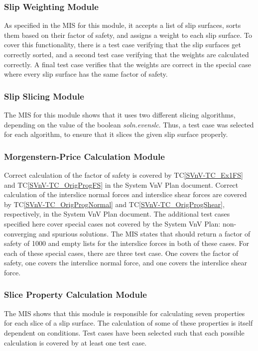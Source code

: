 \documentclass[12pt, titlepage]{article}
\newcommand{\tcref}[1]{TC\ref{#1}}
\begin{document}
\subsubsection{Slip Weighting Module}
As specified in the MIS for this module, it accepts a list of slip surfaces, 
sorts them based on their factor of safety, and assigns a weight to each slip 
surface. To cover this functionality, there is a test case verifying that the 
slip surfaces get correctly sorted, and a second test case verifying that the 
weights are calculated correctly. A final test case verifies that the weights 
are correct in the special case where every slip surface has the same factor of 
safety.

\subsubsection{Slip Slicing Module}
The MIS for this module shows that it uses two different slicing algorithms, 
depending on the value of the boolean \textit{soln.evenslc}. Thus, a test case 
was selected for each algorithm, to ensure that it slices the given slip 
surface properly.

\subsubsection{Morgenstern-Price Calculation Module}
Correct calculation of the factor of safety is covered by \tcref{SVnV-TC_Ex1FS} 
and \tcref{SVnV-TC_OrigProgFS} in the System VnV Plan document. Correct 
calculation of the interslice normal forces and interslice shear forces are 
covered by \tcref{SVnV-TC_OrigProgNormal} and \tcref{SVnV-TC_OrigProgShear}, 
respectively, in the System VnV Plan document. The additional test cases 
specified here cover special cases not covered by the System VnV Plan: 
non-converging and spurious solutions. The MIS states that \progname{} should 
return a factor of safety of 1000 and empty lists for the interslice forces in 
both of these cases. For each of these special cases, there are three test 
case. One covers the factor of safety, one covers the interslice normal force, 
and one covers the interslice shear force.

\subsubsection{Slice Property Calculation Module}
The MIS shows that this module is responsible for calculating seven properties 
for each slice of a slip surface. The calculation of some of these properties 
is itself dependent on conditions. Test cases have been selected such that each 
possible calculation is covered by at least one test case. 
\end{document}
